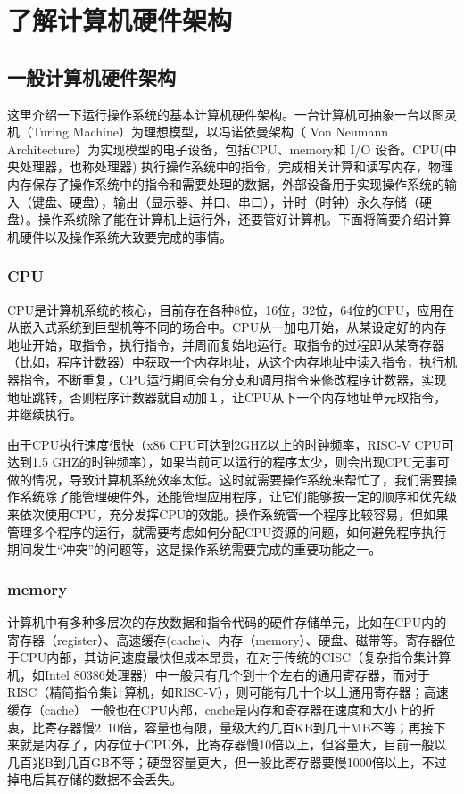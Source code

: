 \section{了解计算机硬件架构}

\subsection{一般计算机硬件架构}

这里介绍一下运行操作系统的基本计算机硬件架构。一台计算机可抽象一台以图灵机（Turing Machine）为理想模型，以冯诺依曼架构（ Von Neumann Architecture）为实现模型的电子设备，包括CPU、memory和 I/O 设备。CPU(中央处理器，也称处理器) 执行操作系统中的指令，完成相关计算和读写内存，物理内存保存了操作系统中的指令和需要处理的数据，外部设备用于实现操作系统的输入（键盘、硬盘），输出（显示器、并口、串口），计时（时钟）永久存储（硬盘）。操作系统除了能在计算机上运行外，还要管好计算机。下面将简要介绍计算机硬件以及操作系统大致要完成的事情。



\subsubsection{CPU} 

CPU是计算机系统的核心，目前存在各种8位，16位，32位，64位的CPU，应用在从嵌入式系统到巨型机等不同的场合中。CPU从一加电开始，从某设定好的内存地址开始，取指令，执行指令，并周而复始地运行。取指令的过程即从某寄存器（比如，程序计数器）中获取一个内存地址，从这个内存地址中读入指令，执行机器指令，不断重复，CPU运行期间会有分支和调用指令来修改程序计数器，实现地址跳转，否则程序计数器就自动加１，让CPU从下一个内存地址单元取指令，并继续执行。

由于CPU执行速度很快（x86 CPU可达到2GHZ以上的时钟频率，RISC-V CPU可达到1.5 GHZ的时钟频率），如果当前可以运行的程序太少，则会出现CPU无事可做的情况，导致计算机系统效率太低。这时就需要操作系统来帮忙了，我们需要操作系统除了能管理硬件外，还能管理应用程序，让它们能够按一定的顺序和优先级来依次使用CPU，充分发挥CPU的效能。操作系统管一个程序比较容易，但如果管理多个程序的运行，就需要考虑如何分配CPU资源的问题，如何避免程序执行期间发生“冲突”的问题等，这是操作系统需要完成的重要功能之一。

\subsubsection{memory}

计算机中有多种多层次的存放数据和指令代码的硬件存储单元，比如在CPU内的寄存器（register）、高速缓存(cache)、内存（memory）、硬盘、磁带等。寄存器位于CPU内部，其访问速度最快但成本昂贵，在对于传统的CISC（复杂指令集计算机，如Intel 80386处理器）中一般只有几个到十个左右的通用寄存器，而对于RISC（精简指令集计算机，如RISC-V），则可能有几十个以上通用寄存器；高速缓存（cache）  一般也在CPU内部，cache是内存和寄存器在速度和大小上的折衷，比寄存器慢2~10倍，容量也有限，量级大约几百KB到几十MB不等；再接下来就是内存了，内存位于CPU外，比寄存器慢10倍以上，但容量大，目前一般以几百兆B到几百GB不等；硬盘容量更大，但一般比寄存器要慢1000倍以上，不过掉电后其存储的数据不会丢失。

